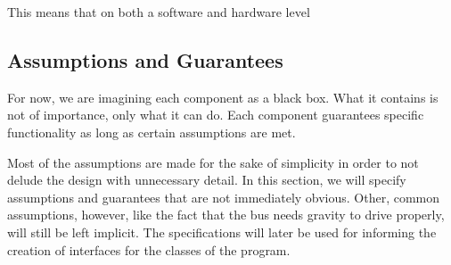 This means that on both a software and hardware level

\subsection{Assumptions and Guarantees}
For now, we are imagining each component as a black box. What it contains is not of importance, only what it can do. Each component guarantees specific functionality as long as certain assumptions are met.

Most of the assumptions are made for the sake of simplicity in order to not delude the design with unnecessary detail. In this section, we will specify assumptions and guarantees that are not immediately obvious. Other, common assumptions, however, like the fact that the bus needs gravity to drive properly, will still be left implicit. The specifications will later be used for informing the creation of interfaces for the classes of the program. 

